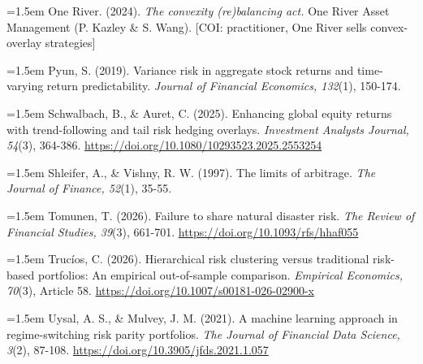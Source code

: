 \documentclass[12pt, a4paper]{article}
\begin{document}
\hangindent=1.5em
One River. (2024). \emph{The convexity (re)balancing act.} One River
Asset Management (P. Kazley \& S. Wang). {[}COI: practitioner, One River
sells convex-overlay strategies{]}

\hangindent=1.5em
Pyun, S. (2019). Variance risk in aggregate stock returns and
time-varying return predictability. \emph{Journal of Financial
Economics, 132}(1), 150-174.

\hangindent=1.5em
Schwalbach, B., \& Auret, C. (2025). Enhancing global equity returns
with trend-following and tail risk hedging overlays. \emph{Investment
Analysts Journal, 54}(3), 364-386.
\url{https://doi.org/10.1080/10293523.2025.2553254}

\hangindent=1.5em
Shleifer, A., \& Vishny, R. W. (1997). The limits of arbitrage.
\emph{The Journal of Finance, 52}(1), 35-55.

\hangindent=1.5em
Tomunen, T. (2026). Failure to share natural disaster risk. \emph{The
Review of Financial Studies, 39}(3), 661-701.
\url{https://doi.org/10.1093/rfs/hhaf055}

\hangindent=1.5em
Trucíos, C. (2026). Hierarchical risk clustering versus traditional
risk-based portfolios: An empirical out-of-sample comparison.
\emph{Empirical Economics, 70}(3), Article 58.
\url{https://doi.org/10.1007/s00181-026-02900-x}

\hangindent=1.5em
Uysal, A. S., \& Mulvey, J. M. (2021). A machine learning approach in
regime-switching risk parity portfolios. \emph{The Journal of Financial
Data Science, 3}(2), 87-108. \url{https://doi.org/10.3905/jfds.2021.1.057}
\end{document}
